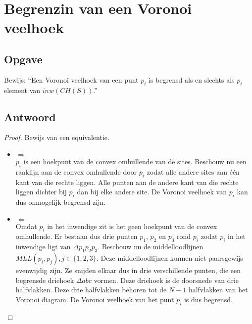 \documentclass[examenvragen.tex]{subfiles}
\begin{document}
\section{Begrenzin van een Voronoi veelhoek}
\subsection{Opgave}
Bewijs: ``Een Voronoi veelhoek van een punt $p_i$ is begrensd als en slechts als $p_i$ element van $inw(CH(S))$.''

\subsection{Antwoord}
\begin{proof}
Bewijs van een equivalentie.
\begin{itemize}
\item $\Rightarrow$\\
$p_i$ is een hoekpunt van de convex omhullende van de sites. Beschouw nu een raaklijn aan de convex omhullende door $p_i$ zodat alle andere sites aan \'e\'en kant van die rechte liggen. Alle punten aan de andere kant van die rechte liggen dichter bij $p_i$ dan bij elke andere site. De Voronoi veelhoek van $p_i$ kan dus onmogelijk begrensd zijn.

\item $\Leftarrow$\\
Omdat $p_i$ in het inwendige zit is het geen hoekpunt van de convex omhullende. Er bestaan dus drie punten $p_1$, $p_2$ en $p_3$ rond $p_i$ zodat $p_i$ in het inwendige ligt van $\Delta p_1p_2p_3$. Beschouw nu de middelloodlijnen $MLL(p_i,p_j), j \in \{1,2,3\}$. Deze middelloodlijnen kunnen niet paarsgewijs evenwijdig zijn. Ze snijden elkaar dus in drie verschillende punten, die een begrensde driehoek $\Delta abc$ vormen. Deze driehoek is de doorsnede van drie halfvlakken. Deze drie halfvlakken behoren tot de $N-1$ halfvlakken van het Voronoi diagram. De Voronoi veelhoek van het punt $p_i$ is dus begrensd. 
\end{itemize}
\end{proof}
\end{document}
